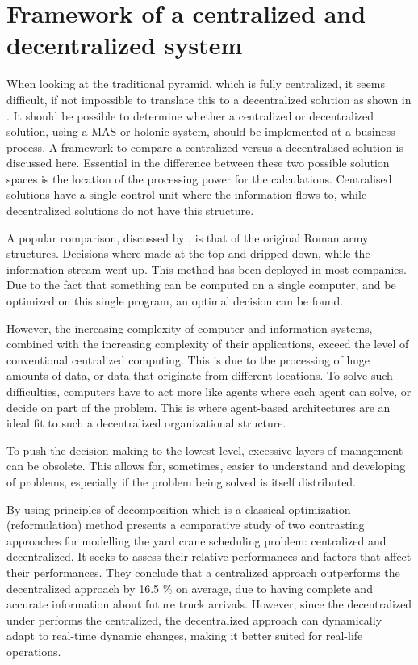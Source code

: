 \section{Framework of a centralized and decentralized system}
When looking at the traditional pyramid, which is fully centralized, it seems difficult, if not impossible to translate this to a decentralized solution as shown in . It should be possible to determine whether a centralized or decentralized solution, using a MAS or holonic system, should be implemented at a business process. A framework to compare a centralized versus a decentralised solution is discussed here. Essential in the difference between these two possible solution spaces is the location of the processing power for the calculations. Centralised solutions have a single control unit where the information flows to, while decentralized solutions do not have this structure.

A popular comparison, discussed by \citet{parunak1999industrial}, is that of the original Roman army structures. Decisions where made at the top and dripped down, while the information stream went up. This method has been deployed in most companies. Due to the fact that something can be computed on a single computer, and be optimized on this single program, an optimal decision can be found.

However, the increasing complexity of computer and information systems, combined with the increasing complexity of their applications, exceed the level of conventional centralized computing. This is due to the processing of huge amounts of data, or data that originate from different locations. To solve such difficulties, computers have to act more like agents where each agent can solve, or decide on part of the problem. This is where agent-based architectures are an ideal fit to such a decentralized organizational structure.

To push the decision making to the lowest level, excessive layers of management can be obsolete. This allows for, sometimes, easier to understand and developing of problems, especially if the problem being solved is itself distributed.

By using principles of decomposition which is a classical optimization (reformulation) method \citep{sharif2012yard} presents a comparative study of two contrasting approaches for modelling the yard crane scheduling problem: centralized and decentralized. It seeks to assess their relative performances and factors that affect their performances. They conclude that a centralized approach outperforms the decentralized approach by 16.5 \% on average, due to having complete and accurate information about future truck arrivals. However, since the decentralized under performs the centralized, the decentralized approach can dynamically adapt to real-time dynamic changes, making it better suited for real-life operations. 

